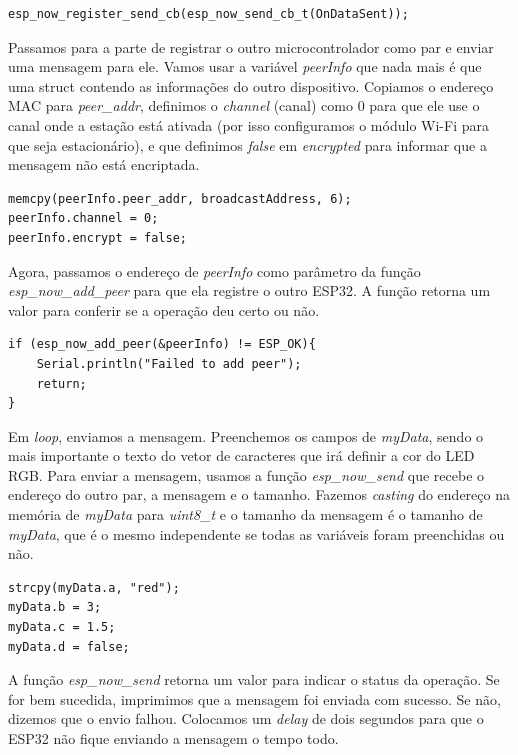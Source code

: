 \documentclass[12pt]{article}
\begin{document}
\begin{lstlisting}
esp_now_register_send_cb(esp_now_send_cb_t(OnDataSent));
\end{lstlisting}

Passamos para a parte de registrar o outro microcontrolador como par e enviar uma mensagem para ele. Vamos usar a variável \textit{peerInfo} que nada mais é que uma struct contendo as informações do outro dispositivo. Copiamos o endereço MAC para \textit{peer\_addr}, definimos o \textit{channel} (canal) como 0 para que ele use o canal onde a estação está ativada (por isso configuramos o módulo Wi-Fi para que seja estacionário), e que definimos \textit{false} em \textit{encrypted} para informar que a mensagem não está encriptada.

\begin{lstlisting}
memcpy(peerInfo.peer_addr, broadcastAddress, 6);
peerInfo.channel = 0;  
peerInfo.encrypt = false;
\end{lstlisting}

Agora, passamos o endereço de \textit{peerInfo} como parâmetro da função \textit{esp\_now\_add\_peer} para que ela registre o outro ESP32. A função retorna um valor para conferir se a operação deu certo ou não.

\begin{lstlisting}
if (esp_now_add_peer(&peerInfo) != ESP_OK){
    Serial.println("Failed to add peer");
    return;
}
\end{lstlisting}

Em \textit{loop}, enviamos a mensagem. Preenchemos os campos de \textit{myData}, sendo o mais importante o texto do vetor de caracteres que irá definir a cor do LED RGB. Para enviar a mensagem, usamos a função \textit{esp\_now\_send} que recebe o endereço do outro par, a mensagem e o tamanho. Fazemos \textit{casting} do endereço na memória de \textit{myData} para \textit{uint8\_t} e o tamanho da mensagem é o tamanho de \textit{myData}, que é o mesmo independente se todas as variáveis foram preenchidas ou não.

\begin{lstlisting}
strcpy(myData.a, "red");
myData.b = 3;
myData.c = 1.5;
myData.d = false;
\end{lstlisting}

A função \textit{esp\_now\_send} retorna um valor para indicar o status da operação. Se for bem sucedida, imprimimos que a mensagem foi enviada com sucesso. Se não, dizemos que o envio falhou. Colocamos um \textit{delay} de dois segundos para que o ESP32 não fique enviando a mensagem o tempo todo.
\end{document}
